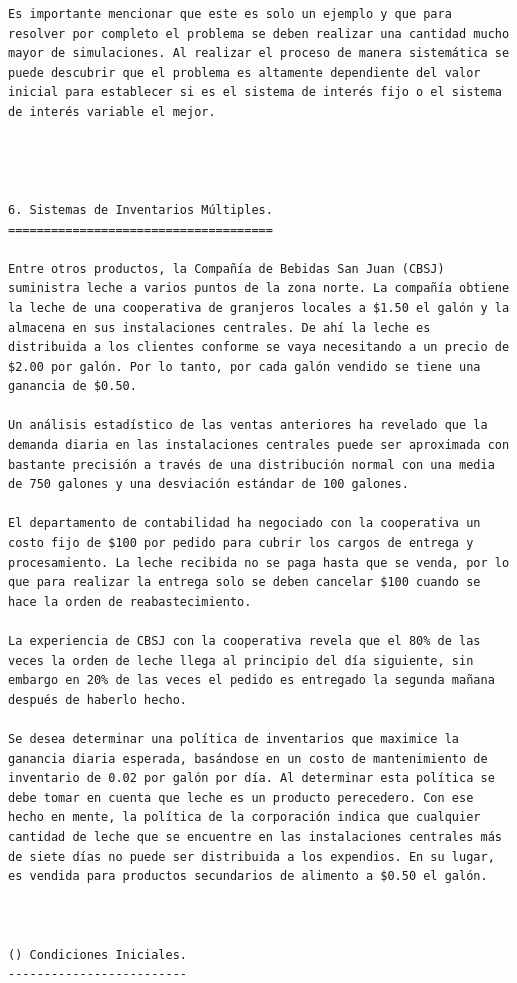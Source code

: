 \begin{verbatim}
Es importante mencionar que este es solo un ejemplo y que para resolver por completo el problema se deben realizar una cantidad mucho mayor de simulaciones. Al realizar el proceso de manera sistemática se puede descubrir que el problema es altamente dependiente del valor inicial para establecer si es el sistema de interés fijo o el sistema de interés variable el mejor.




6. Sistemas de Inventarios Múltiples.
=====================================

Entre otros productos, la Compañía de Bebidas San Juan (CBSJ) suministra leche a varios puntos de la zona norte. La compañía obtiene la leche de una cooperativa de granjeros locales a $1.50 el galón y la almacena en sus instalaciones centrales. De ahí la leche es distribuida a los clientes conforme se vaya necesitando a un precio de $2.00 por galón. Por lo tanto, por cada galón vendido se tiene una ganancia de $0.50.

Un análisis estadístico de las ventas anteriores ha revelado que la demanda diaria en las instalaciones centrales puede ser aproximada con bastante precisión a través de una distribución normal con una media de 750 galones y una desviación estándar de 100 galones.

El departamento de contabilidad ha negociado con la cooperativa un costo fijo de $100 por pedido para cubrir los cargos de entrega y procesamiento. La leche recibida no se paga hasta que se venda, por lo que para realizar la entrega solo se deben cancelar $100 cuando se hace la orden de reabastecimiento.

La experiencia de CBSJ con la cooperativa revela que el 80% de las veces la orden de leche llega al principio del día siguiente, sin embargo en 20% de las veces el pedido es entregado la segunda mañana después de haberlo hecho.

Se desea determinar una política de inventarios que maximice la ganancia diaria esperada, basándose en un costo de mantenimiento de inventario de 0.02 por galón por día. Al determinar esta política se debe tomar en cuenta que leche es un producto perecedero. Con ese hecho en mente, la política de la corporación indica que cualquier cantidad de leche que se encuentre en las instalaciones centrales más de siete días no puede ser distribuida a los expendios. En su lugar, es vendida para productos secundarios de alimento a $0.50 el galón.



() Condiciones Iniciales.
-------------------------



\end{verbatim}
